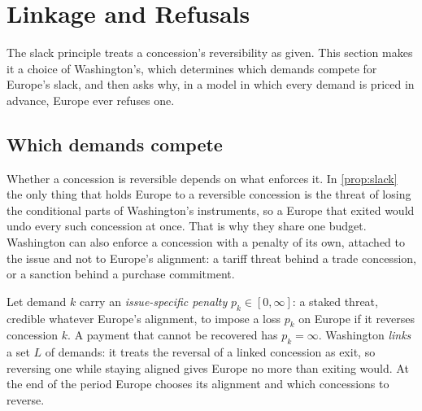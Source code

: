 \section{Linkage and Refusals}\label{sec:linkref}

The slack principle treats a concession's reversibility as given. This section makes it a choice of Washington's, which determines which demands compete for Europe's slack, and then asks why, in a model in which every demand is priced in advance, Europe ever refuses one.

\subsection{Which demands compete}\label{sec:linkage}

Whether a concession is reversible depends on what enforces it. In \cref{prop:slack} the only thing that holds Europe to a reversible concession is the threat of losing the conditional parts of Washington's instruments, so a Europe that exited would undo every such concession at once. That is why they share one budget. Washington can also enforce a concession with a penalty of its own, attached to the issue and not to Europe's alignment: a tariff threat behind a trade concession, or a sanction behind a purchase commitment.

Let demand $k$ carry an \emph{issue-specific penalty} $p_k\in[0,\infty]$: a staked threat, credible whatever Europe's alignment, to impose a loss $p_k$ on Europe if it reverses concession $k$. A payment that cannot be recovered has $p_k=\infty$. Washington \emph{links} a set $L$ of demands: it treats the reversal of a linked concession as exit, so reversing one while staying aligned gives Europe no more than exiting would. At the end of the period Europe chooses its alignment and which concessions to reverse.

